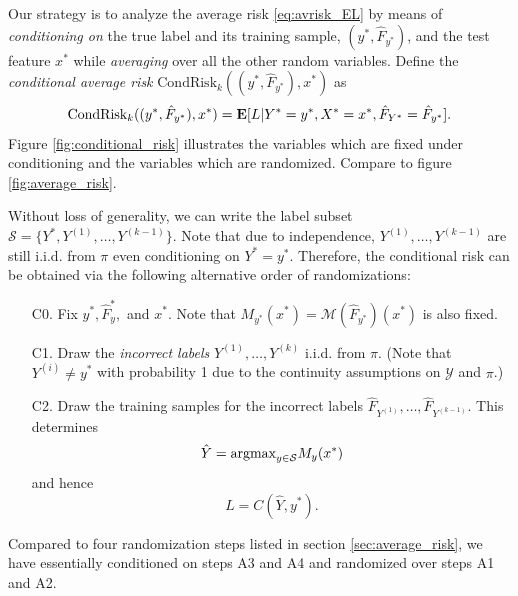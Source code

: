 \documentclass[12pt]{article}
\begin{document}
Our strategy is to analyze the average risk \eqref{eq:avrisk_EL} by
means of \emph{conditioning on} the true label and its training
sample, $(y^*, \hat{F}_{y^*})$, and the test feature $x^*$
while \emph{averaging} over all the other random variables.  Define
the \emph{conditional average risk} $\text{CondRisk}_k((y^*, \hat{F}_{y^*}), x^*)$ as
\[
\text{CondRisk}_k((y^*, \hat{F}_{y^*}), x^*) = \textbf{E}[L|Y^*=y^*, X^* = x^*, \hat{F}_{Y^*} = \hat{F}_{y^*}].
\]
Figure \ref{fig:conditional_risk} illustrates the variables which are
fixed under conditioning and the variables which are randomized.
Compare to figure \ref{fig:average_risk}.

Without loss of generality, we can write the label subset $\mathcal{S}
= \{Y^*, Y^{(1)},\hdots, Y^{(k-1)}\}$.  Note that due to independence,
$Y^{(1)},\hdots, Y^{(k-1)}$ are still i.i.d. from $\pi$ even
conditioning on $Y^* = y^*.$ Therefore, the conditional risk can be
obtained via the following alternative order of randomizations:
\begin{enumerate}
\item[C0.] 
Fix $y^*, \hat{F}_y^*,$ and $x^*$.  Note that $M_{y^*}(x^*)
= \mathcal{M}(\hat{F}_{y^*})(x^*)$ is also fixed.
\item[C1.]
Draw the \emph{incorrect labels} $Y^{(1)},\hdots, Y^{(k)}$ i.i.d. from
$\pi$.  (Note that $Y^{(i)} \neq y^*$ with probability 1 due to the
continuity assumptions on $\mathcal{Y}$ and $\pi$.)
\item[C2.]
Draw the training samples for the incorrect labels
$\hat{F}_{Y^{(1)}},\hdots, \hat{F}_{Y^{(k-1)}}$.  This determines
\[
\hat{Y} = \text{argmax}_{y \in \mathcal{S}} M_y(x^*)
\]
and hence
\[
L = C(\hat{Y}, y^*).
\]
\end{enumerate}
Compared to four randomization steps listed in
section \ref{sec:average_risk}, we have essentially conditioned on
steps A3 and A4 and randomized over steps A1 and A2.

\end{document}
